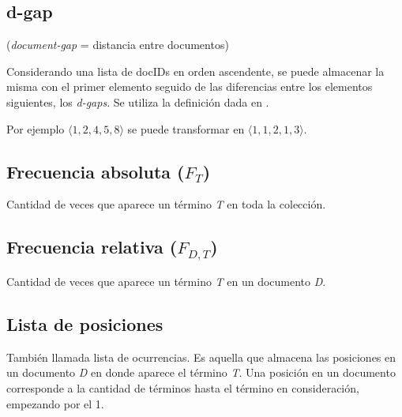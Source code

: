 \subsection{d-gap}
\noindent(\textit{document-gap} = distancia entre documentos)

Considerando una lista de docIDs en orden ascendente, se puede almacenar la misma con el primer elemento seguido de las diferencias entre los elementos siguientes, los \textit{d-gaps}. Se utiliza la definición dada en \citet[p.~115]{WittenMoffatBell99}.

Por ejemplo $\langle 1, 2, 4 , 5 , 8 \rangle$ se puede transformar en $\langle 1, 1, 2 , 1 , 3 \rangle$.




\subsection{Frecuencia absoluta (\texorpdfstring{$F_{T}$}{FF})}

Cantidad de veces que aparece un término \textit{T} en toda la colección.


\subsection{Frecuencia relativa (\texorpdfstring{$F_{D,T}$}{FFD})}

Cantidad de veces que aparece un término \textit{T} en un documento \textit{D}.

\subsection{Lista de posiciones}

También llamada lista de ocurrencias. Es aquella que almacena las posiciones en un documento \textit{D} en donde aparece el término \textit{T}. Una posición en un documento corresponde a la cantidad de términos hasta el término en consideración, empezando por el 1.